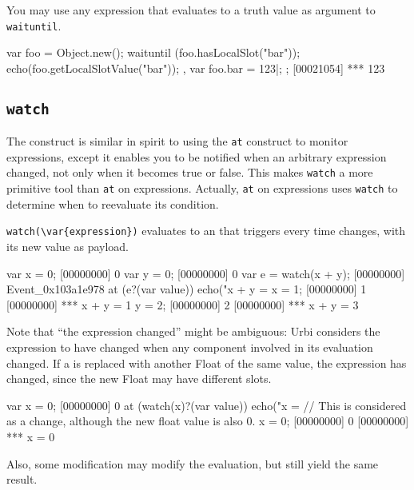 You may use any expression that evaluates to a truth value as argument
to \lstinline{waituntil}.

\begin{urbiscript}
{
  var foo = Object.new();
  {
    waituntil (foo.hasLocalSlot("bar"));
    echo(foo.getLocalSlotValue("bar"));
  },
  var foo.bar = 123|;
};
[00021054] *** 123
\end{urbiscript}

\subsection{\lstinline{watch}}
\label{sec:lang:watch}



The  construct is similar in spirit to using the
\lstinline{at} construct to monitor expressions, except it enables you to be
notified when an arbitrary expression changed, not only when it becomes true
or false. This makes \lstinline{watch} a more primitive tool than
\lstinline{at} on expressions.  Actually, \lstinline{at} on expressions uses
\lstinline{watch} to determine when to reevaluate its condition.

\lstinline|watch(\var{expression})| evaluates to an  that
triggers every time  changes, with its new value as payload.

\begin{urbiscript}[firstnumber=1]
var x = 0;
[00000000] 0
var y = 0;
[00000000] 0
var e = watch(x + y);
[00000000] Event_0x103a1e978
at (e?(var value))
  echo("x + y = %
x = 1;
[00000000] 1
[00000000] *** x + y = 1
y = 2;
[00000000] 2
[00000000] *** x + y = 3
\end{urbiscript}

Note that ``the expression changed'' might be ambiguous: Urbi considers the
expression to have changed when any component involved in its evaluation
changed.  If a  is replaced with another Float of the same
value, the expression has changed, since the new Float may have different
slots.

\begin{urbiscript}[firstnumber=1]
var x = 0;
[00000000] 0
at (watch(x)?(var value))
  echo("x = %
// This is considered as a change, although the new float value is also 0.
x = 0;
[00000000] 0
[00000000] *** x = 0
\end{urbiscript}

Also, some modification may modify the evaluation, but still yield the same
result.

